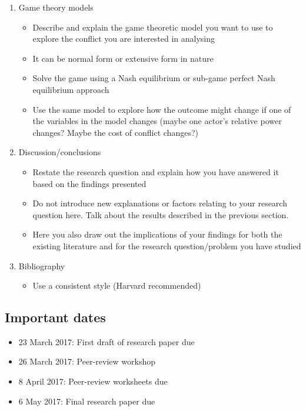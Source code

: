 \documentclass[12pt,a4paper]{article}
\begin{document}
\begin{enumerate}
\begin{itemize}
	\end{itemize}
	\item Game theory models
	\begin{itemize}
		\item Describe and explain the game theoretic model you want to use to explore the conflict you are interested in analysing
		\item It can be normal form or extensive form in nature
		\item Solve the game using a Nash equilibrium or sub-game perfect Nash equilibrium approach
		\item Use the same model to explore how the outcome might change if one of the variables in the model changes (maybe one actor’s relative power changes? Maybe the cost of conflict changes?)
	\end{itemize}
	\item Discussion/conclusions
	\begin{itemize}
		\item Restate the research question and explain how you have answered it based on the findings presented
		\item Do not introduce new explanations or factors relating to your research question here. Talk about the results described in the previous section.
		\item Here you also draw out the implications of your findings for both the existing literature and for the research question/problem you have studied
	\end{itemize}
	\item Bibliography
	\begin{itemize}
		\item Use a consistent style (Harvard recommended)
	\end{itemize}
\end{enumerate}

\subsection*{Important dates}

\begin{itemize}
	\item 23 March 2017: First draft of research paper due
	\item 26 March 2017: Peer-review workshop
	\item 8 April 2017: Peer-review worksheets due
	\item 6 May 2017: Final research paper due
\end{itemize}
\end{document}
